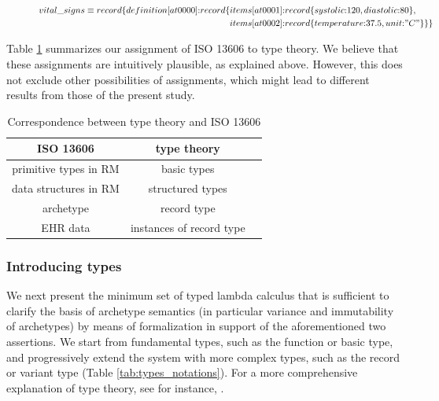 \documentclass[preprint,3p,onecolumn,times,review]{article}
\begin{document}
{\begin{figure}[!htbp]
\begin{alignat}{3}
  vital\_signs \equiv record\{definition[at0000] \text{:} record\{&items[at0001] \text{:} record\{systolic\text{:} 120, diastolic \text{:} 80\},\nonumber\\
                                                                    &items[at0002] \text{:} record\{temperature\text{:} 37.5, unit \text{:} "C"\}\}\} \label{eqn:vital_signs_instance}
\end{alignat}
\end{figure}

Table \ref{tab:correspondence} summarizes our assignment of ISO 13606 to type theory.
We believe that these assignments are intuitively plausible, as explained above.
However, this does not exclude other possibilities of assignments, which might lead to different results from those of the present study.

\begin{table}[!htbp]
  \centering
  \caption{Correspondence between type theory and ISO 13606}\label{tab:correspondence}
  \begin{tabular}{ccc}
    \toprule%
    ISO 13606 & type theory \\
    \midrule
    primitive types in RM & basic types \\
    data structures in RM & structured types \\
    archetype & record type \\
    EHR data & instances of record type\\
    \bottomrule%
  \end{tabular}
\end{table}


\subsubsection{Introducing types}

We next present the minimum set of typed lambda calculus that is sufficient to clarify the basis of archetype semantics (in particular variance and immutability of archetypes) by means of formalization in support of the aforementioned two assertions. 
We start from fundamental types, such as the function or basic type, and progressively extend the system with more complex types, such as the record or variant type (Table \ref{tab:types_notations}).
For a more comprehensive explanation of type theory, see for instance, \cite{pierce02:_types_progr_languag,cardelli04:_type_system,barendregt13:_lambd_calcul_types}.


}
\end{document}
